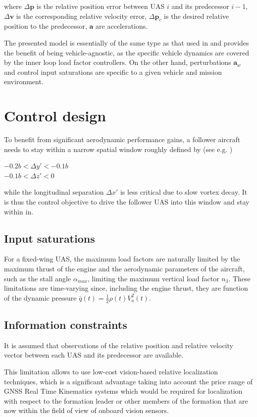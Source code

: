 \documentclass{ifacconf}
\providecommand{\mbf}[1]{\mathbf{#1}}
\begin{document}
where $\Delta \mbf{p}$ is the relative position error between UAS $i$ and its predecessor $i-1$, $\Delta \mbf{v}$ is the corresponding relative velocity error, $\Delta \mbf{p}_c$ is the desired relative position to the predecessor, $\mbf{a}$ are accelerations.

The presented model is essentially of the same type as that used in  \cite{galzi2006uav} and provides the benefit of being vehicle-agnostic, as the specific vehicle dynamics are covered by the inner loop load factor controllers. On the other hand, perturbations $\mbf{a}_w$ and control input saturations are specific to a given vehicle and mission environment.

\section{Control design}
To benefit from significant aerodynamic performance gains, a follower aircraft needs to stay within a narrow spatial window roughly defined by (see e.g. \cite{jake2003f})

{\centering
$-0.2 b < \Delta y' < -0.1 b$ \\
$-0.1 b < \Delta z' < 0$ \\
}

while the longitudinal separation $\Delta x'$ is less critical due to slow vortex decay.
It is thus the control objective to drive the follower UAS into this window and stay within in.

\subsection{Input saturations}
For a fixed-wing UAS, the maximum load factors are naturally limited by the maximum thrust of the engine and the aerodynamic parameters of the aircraft, such as the stall angle $\alpha_{max}$, limiting the maximum vertical load factor $n_3$. These  limitations are time-varying since, including the engine thrust, they are function of the dynamic pressure $\bar{q}(t) = \frac{1}{2}\rho(t) V_a^2(t)$.

\subsection{Information constraints}
It is assumed that observations of the relative position and relative velocity vector between each UAS and its predecessor are available.

This limitation allows to use low-cost vision-based relative localization techniques, which is a significant advantage taking into account the price range of GNSS Real Time Kinematics systems which would be required for localization with respect to the formation leader or other members of the formation that are now within the field of view of onboard vision sensors.
\end{document}
